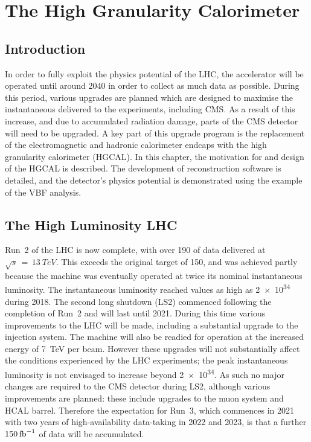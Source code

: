\chapter{The High Granularity Calorimeter}
\label{chap:hgcal}

\section{Introduction}
In order to fully exploit the physics potential of the LHC, 
the accelerator will be operated until around 2040 
in order to collect as much data as possible.
During this period, various upgrades are planned 
which are designed to maximise the instantaneous delivered to the experiments, including CMS.
As a result of this increase, and due to accumulated radiation damage, 
parts of the CMS detector will need to be upgraded.
A key part of this upgrade program is the replacement of the electromagnetic 
and hadronic calorimeter endcaps with the high granularity calorimeter (HGCAL).
In this chapter, the motivation for and design of the HGCAL is described.
The development of reconstruction software is detailed, 
and the detector's physics potential is demonstrated using the example of the VBF \Hgg analysis.

\section{The High Luminosity LHC}

Run~2 of the LHC is now complete, with over \SI{190}{\fbinv} of data delivered at $\sqrt{s}\,=\,\SI{13}{TeV}$. %
This exceeds the original target of \SI{150}{\fbinv}, and was achieved partly because the machine was eventually operated at twice its nominal instantaneous luminosity.
The instantaneous luminosity reached values as high as \SI{2e34}{\lumi} during 2018.
The second long shutdown (LS2) commenced following the completion of Run~2 and will last until 2021.
During this time various improvements to the LHC will be made, including a substantial upgrade to the injection system.
The machine will also be readied for operation at the increased energy of \SI{7}{TeV} per beam.
However these upgrades will not substantially affect the conditions experienced by the LHC experiments; 
the peak instantaneous luminosity is not envisaged to increase beyond \SI{2e34}{\lumi}.
As such no major changes are required to the CMS detector during LS2, although various improvements are planned: 
these include upgrades to the muon system and HCAL barrel.
Therefore the expectation for Run~3, which commences in 2021 with two years of high-availability data-taking in 2022 and 2023, 
is that a further $\SI{150}{\ensuremath{\textrm{fb}^{-1}}}$ of data will be accumulated. 

